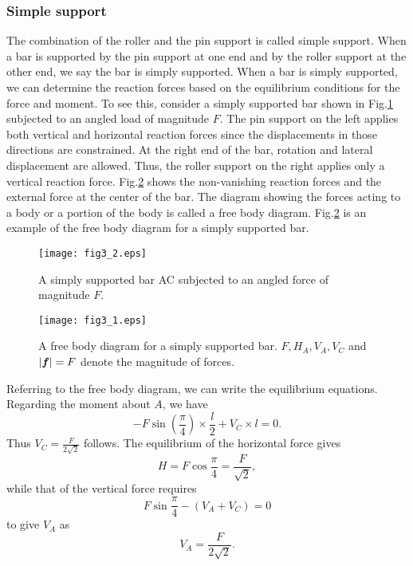 ﻿\documentclass[10pt,a4j]{article}
\begin{document}
\subsubsection{Simple support}
The combination of the roller and the pin support is called simple support. 
When a bar is supported by the pin support at one end and by the roller support at the other end, we say the bar is simply supported. When a bar is simply supported, we can determine the reaction forces based on the equilibrium conditions for the force and moment. To see this, consider a simply supported bar shown in Fig.\ref{fig:fig3_2} subjected to an angled load of magnitude $F$. The pin support on the left applies both vertical and horizontal reaction forces since the displacements in those directions are constrained. At the right end of the bar, rotation and lateral displacement are allowed. Thus, the roller support on the right applies only a vertical reaction force. Fig.\ref{fig:fig3_1} shows the non-vanishing reaction forces and the external force at the center of the bar. The diagram showing the forces acting to a body or a portion of the body is called a free body diagram. Fig.\ref{fig:fig3_1} is an example of the free body diagram for a simply supported bar.
\begin{figure}[h]
	\begin{center}
	\texttt{[image: fig3\_2.eps]} 
	\end{center}
	\caption{A simply supported bar AC subjected to an angled force of magnitude $F$.}
	\label{fig:fig3_2}
\end{figure}
\begin{figure}[h]
	\begin{center}
	\texttt{[image: fig3\_1.eps]} 
	\end{center}
	\caption{
		A free body diagram for a simply supported bar.
		$F, H_A, V_A, V_C$ and $|\mbox{\boldmath $f$}|=F$ denote the magnitude of forces.
	}
	\label{fig:fig3_1}
\end{figure}
Referring to the free body diagram, we can write the equilibrium equations.
Regarding the moment about $A$, we have  
\[
	-F\sin\left(\frac{\pi}{4}\right)\times \frac{l}{2} + V_C\times l =0.
\]
Thus $V_C=\frac{F}{2\sqrt{2}}$ follows. 
The equilibrium of the horizontal force gives
\[
	H=F\cos\frac{\pi}{4}=\frac{F}{\sqrt{2}}, 
\]
while that of the vertical force requires 
\[
	F\sin\frac{\pi}{4} -(V_A+V_C)=0
\]
to give $V_A$ as 
\[
	V_A=\frac{F}{2\sqrt{2}}.
\]
\end{document}
